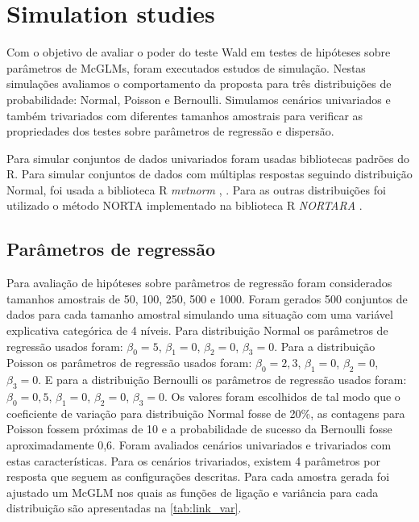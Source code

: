 \documentclass[AMA,STIX1COL]{WileyNJD-v2}
\begin{document}

\section{Simulation studies}\label{sec5}

Com o objetivo de avaliar o poder do teste Wald em testes de hipóteses sobre parâmetros de McGLMs, foram executados estudos de simulação. Nestas simulações avaliamos o comportamento da proposta para três distribuições de probabilidade: Normal, Poisson e Bernoulli. Simulamos cenários univariados e também trivariados com diferentes tamanhos amostrais para verificar as propriedades dos testes sobre parâmetros de regressão e dispersão.

Para simular conjuntos de dados univariados foram usadas bibliotecas padrões do R. Para simular conjuntos de dados com múltiplas respostas seguindo distribuição Normal, foi usada a biblioteca R \emph{mvtnorm} \citep{mvtnorm1}, \citep{mvtnorm2}. Para as outras distribuições foi utilizado o método NORTA \citep{cario1997modeling} implementado na biblioteca R \emph{NORTARA} \citep{nortara}.

\subsection{Parâmetros de regressão}

Para avaliação de hipóteses sobre parâmetros de regressão foram considerados tamanhos amostrais de 50, 100, 250, 500 e 1000. Foram gerados 500 conjuntos de dados para cada tamanho amostral simulando uma situação com uma variável explicativa categórica de 4 níveis. Para distribuição Normal os parâmetros de regressão usados foram: $\beta_0 = 5$, $\beta_1 = 0$, $\beta_2 = 0$, $\beta_3 = 0$. Para a distribuição Poisson os parâmetros de regressão usados foram: $\beta_0 = 2,3$, $\beta_1 = 0$, $\beta_2 = 0$, $\beta_3 = 0$. E para a distribuição Bernoulli os parâmetros de regressão usados foram: $\beta_0 = 0,5$, $\beta_1 = 0$, $\beta_2 = 0$, $\beta_3 = 0$. Os valores foram escolhidos de tal modo que o coeficiente de variação para distribuição Normal fosse de 20\%, as contagens para Poisson fossem próximas de 10 e a probabilidade de sucesso da Bernoulli fosse aproximadamente 0,6. Foram avaliados cenários univariados e trivariados com estas características. Para os cenários trivariados, existem 4 parâmetros por resposta que seguem as configurações descritas. Para cada amostra gerada foi ajustado um McGLM nos quais as funções de ligação e variância para cada distribuição são apresentadas na \autoref{tab:link_var}. 
\end{document}
